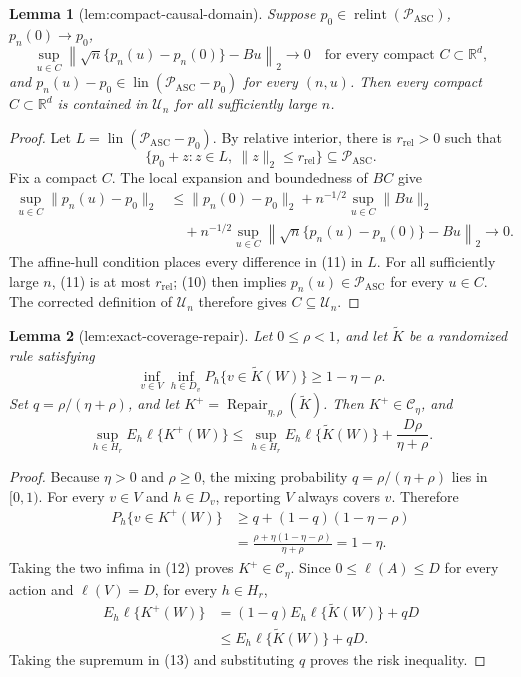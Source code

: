 \documentclass{article}
\newtheorem{lemma}{Lemma}
\begin{document}
\begin{lemma}[lem:compact-causal-domain]\label{lem:compact-causal-domain}
Suppose \(p_0\in\operatorname{relint}(\mathcal P_{\mathrm{ASC}})\), \(p_n(0)\to p_0\),
\[
 \sup_{u\in C}\left\|\sqrt n\{p_n(u)-p_n(0)\}-Bu\right\|_2\to0
 \quad\text{for every compact }C\subset\mathbb R^d,
\]
and \(p_n(u)-p_0\in\operatorname{lin}(\mathcal P_{\mathrm{ASC}}-p_0)\) for every \((n,u)\).  Then every compact \(C\subset\mathbb R^d\) is contained in \(\mathcal U_n\) for all sufficiently large \(n\).
\end{lemma}
\begin{proof}
Let \(L=\operatorname{lin}(\mathcal P_{\mathrm{ASC}}-p_0)\).  By relative interior, there is \(r_{\mathrm{rel}}>0\) such that
\[
 \{p_0+z:z\in L,\ \|z\|_2\le r_{\mathrm{rel}}\}
 \subseteq\mathcal P_{\mathrm{ASC}}. \tag{10}
\]
Fix a compact \(C\).  The local expansion and boundedness of \(B C\) give
\[
 \begin{aligned}
 \sup_{u\in C}\|p_n(u)-p_0\|_2
 &\le \|p_n(0)-p_0\|_2
   +n^{-1/2}\sup_{u\in C}\|Bu\|_2\\
 &\quad+n^{-1/2}\sup_{u\in C}
 \left\|\sqrt n\{p_n(u)-p_n(0)\}-Bu\right\|_2
 \longrightarrow0.
 \end{aligned} \tag{11}
\]
The affine-hull condition places every difference in (11) in \(L\).  For all sufficiently large \(n\), (11) is at most \(r_{\mathrm{rel}}\); (10) then implies \(p_n(u)\in\mathcal P_{\mathrm{ASC}}\) for every \(u\in C\).  The corrected definition of \(\mathcal U_n\) therefore gives \(C\subseteq\mathcal U_n\).
\end{proof}

\begin{lemma}[lem:exact-coverage-repair]\label{lem:exact-coverage-repair}
Let \(0\le\rho<1\), and let \(\widetilde K\) be a randomized rule satisfying
\[
 \inf_{v\in V}\inf_{h\in D_v}P_h\{v\in\widetilde K(W)\}
 \ge1-\eta-\rho.
\]
Set \(q=\rho/(\eta+\rho)\), and let \(K^+=\operatorname{Repair}_{\eta,\rho}(\widetilde K)\).  Then \(K^+\in\mathcal C_\eta\), and
\[
 \sup_{h\in H_r}E_h\ell\{K^+(W)\}
 \le
 \sup_{h\in H_r}E_h\ell\{\widetilde K(W)\}
 +\frac{D\rho}{\eta+\rho}.
\]
\end{lemma}
\begin{proof}
Because \(\eta>0\) and \(\rho\ge0\), the mixing probability \(q=\rho/(\eta+\rho)\) lies in \([0,1)\).  For every \(v\in V\) and \(h\in D_v\), reporting \(V\) always covers \(v\).  Therefore
\[
 \begin{aligned}
 P_h\{v\in K^+(W)\}
 &\ge q+(1-q)(1-\eta-\rho)\\
 &=\frac{\rho+\eta(1-\eta-\rho)}{\eta+\rho}
 =1-\eta.
 \end{aligned} \tag{12}
\]
Taking the two infima in (12) proves \(K^+\in\mathcal C_\eta\).  Since \(0\le\ell(A)\le D\) for every action and \(\ell(V)=D\), for every \(h\in H_r\),
\[
 \begin{aligned}
 E_h\ell\{K^+(W)\}
 &=(1-q)E_h\ell\{\widetilde K(W)\}+qD\\
 &\le E_h\ell\{\widetilde K(W)\}+qD.
 \end{aligned} \tag{13}
\]
Taking the supremum in (13) and substituting \(q\) proves the risk inequality.
\end{proof}
\end{document}
